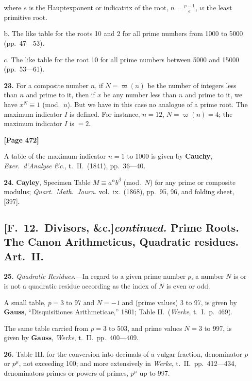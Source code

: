 \documentclass[11pt,a4paper]{article}
\begin{document}
where $e$ is the Hauptexponent or indicatrix of the root, $n = \frac{p-1}{e}$, $w$ the least primitive root.

b. The like table for the roots 10 and 2 for all prime numbers from 1000 to 5000 (pp.\ 47---53).

c. The like table for the root 10 for all prime numbers between 5000 and 15000 (pp.\ 53---61).

\textbf{23.} For a composite number $n$, if $N = \varpi(n)$ be the number of integers less than $n$ and prime to it,
then if $x$ be any number less than $n$ and prime to it, we have $x^{N} \equiv 1$ (mod.\ $n$).
But we have in this case no analogue of a prime root. The maximum indicator $I$ is defined.
For instance, $n = 12$, $N = \varpi(n) = 4$; the maximum indicator $I$ is $= 2$.

\newpage
\textbf{[Page 472]}

A table of the maximum indicator $n = 1$ to 1000 is given by
\quad\textbf{Cauchy}, \textit{Exer.\ d'Analyse \&c.}, t.\ II.\ (1841), pp.\ 36---40.

\textbf{24.} \textbf{Cayley}, Specimen Table $M \equiv a^{\alpha}b^{\beta}$ (mod.\ $N$) for any prime or composite modulus;
\textit{Quart.\ Math.\ Journ.} vol.\ ix.\ (1868), pp.\ 95, 96, and folding sheet, [397].

\subsection*{[F.\ 12.\ Divisors, \&c.]\textit{continued.} Prime Roots. The Canon Arithmeticus, Quadratic residues. Art.\ II.}

\textbf{25.} \textit{Quadratic Residues.}---In regard to a given prime number $p$, a number $N$ is or is not a quadratic residue
according as the index of $N$ is even or odd.

A small table, $p = 3$ to 97 and $N = -1$ and (prime values) 3 to 97, is given by
\quad\textbf{Gauss}, ``Disquisitiones Arithmeticae,'' 1801; Table II.\ (\textit{Werke}, t.\ I.\ p.\ 469).

The same table carried from $p = 3$ to 503, and prime values $N = 3$ to 997, is given by
\quad\textbf{Gauss}, \textit{Werke}, t.\ II.\ pp.\ 400---409.

\textbf{26.} Table III. for the conversion into decimals of a vulgar fraction, denominator $p$ or $p^{\mu}$, not exceeding 100;
and more extensively in \textit{Werke}, t.\ II.\ pp.\ 412---434, denominators primes or powers of primes, $p^{\mu}$ up to 997.
\end{document}
